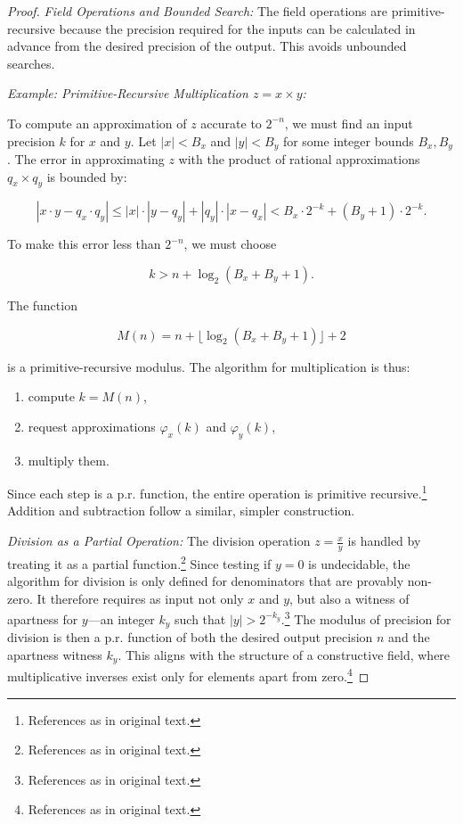 \documentclass[12pt, a4paper]{article}
\begin{document}
\begin{proof}
\medskip
\noindent \textit{Field Operations and Bounded Search:} The field operations are primitive-recursive because the precision required for the inputs can be calculated in advance from the desired precision of the output. This avoids unbounded searches.

\medskip
\noindent \textit{Example: Primitive-Recursive Multiplication \( z = x \times y \):}

To compute an approximation of \( z \) accurate to \( 2^{-n} \), we must find an input precision \( k \) for \( x \) and \( y \). Let \( |x| < B_x \) and \( |y| < B_y \) for some integer bounds \( B_x, B_y \). The error in approximating \( z \) with the product of rational approximations \( q_x \times q_y \) is bounded by:

\[
|x \cdot y - q_x \cdot q_y| \leq |x| \cdot |y - q_y| + |q_y| \cdot |x - q_x| < B_x \cdot 2^{-k} + (B_y + 1) \cdot 2^{-k}.
\]

To make this error less than \( 2^{-n} \), we must choose

\[
k > n + \log_2 (B_x + B_y + 1).
\]

The function 

\[
M(n) = n + \lfloor \log_2 (B_x + B_y + 1) \rfloor + 2
\]

is a primitive-recursive modulus. The algorithm for multiplication is thus:
\begin{enumerate}
    \item compute \( k = M(n) \),
    \item request approximations \(\varphi_x(k)\) and \(\varphi_y(k)\),
    \item multiply them.
\end{enumerate}

Since each step is a p.r. function, the entire operation is primitive recursive.\footnote{References as in original text.} Addition and subtraction follow a similar, simpler construction.

\medskip
\noindent \textit{Division as a Partial Operation:} The division operation \( z = \frac{x}{y} \) is handled by treating it as a partial function.\footnote{References as in original text.} Since testing if \( y = 0 \) is undecidable, the algorithm for division is only defined for denominators that are provably non-zero. It therefore requires as input not only \( x \) and \( y \), but also a witness of apartness for \( y \)—an integer \( k_y \) such that \( |y| > 2^{-k_y} \).\footnote{References as in original text.} The modulus of precision for division is then a p.r. function of both the desired output precision \( n \) and the apartness witness \( k_y \). This aligns with the structure of a constructive field, where multiplicative inverses exist only for elements apart from zero.\footnote{References as in original text.}


\end{proof}
\end{document}

